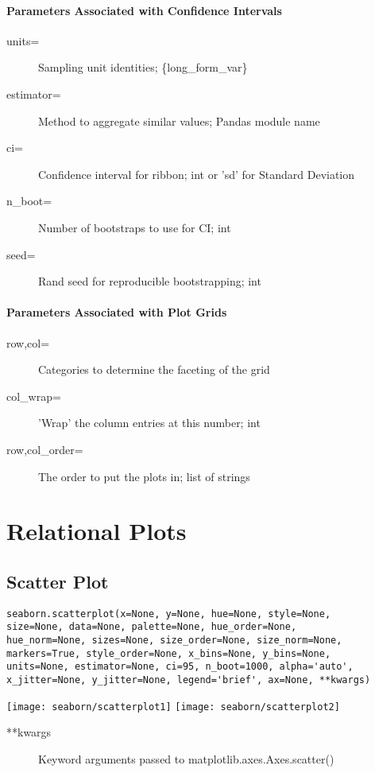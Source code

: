 \paragraph{Parameters Associated with Confidence Intervals}
\begin{description}
	\item[units=] Sampling unit identities; \{long\_form\_var\}
	\item[estimator=] Method to aggregate similar values; Pandas module name
	\item[ci=] Confidence interval for ribbon; int or 'sd' for Standard Deviation
	\item[n\_boot=] Number of bootstraps to use for CI; int
	\item[seed=] Rand seed for reproducible bootstrapping; int
\end{description}

\paragraph{Parameters Associated with Plot Grids}
\begin{description}
	\item[row,col=] Categories to determine the faceting of the grid
	\item[col\_wrap=] 'Wrap' the column entries at this number; int
	\item[row,col\_order=] The order to put the plots in; list of strings
\end{description}

\section{Relational Plots} 

\subsection{Scatter Plot}
\begin{verbatim}
seaborn.scatterplot(x=None, y=None, hue=None, style=None, 
size=None, data=None, palette=None, hue_order=None, 
hue_norm=None, sizes=None, size_order=None, size_norm=None, 
markers=True, style_order=None, x_bins=None, y_bins=None, 
units=None, estimator=None, ci=95, n_boot=1000, alpha='auto', 
x_jitter=None, y_jitter=None, legend='brief', ax=None, **kwargs)
\end{verbatim}
\texttt{[image: seaborn/scatterplot1]}
\texttt{[image: seaborn/scatterplot2]}
\begin{description}
	\item[**kwargs] Keyword arguments passed to matplotlib.axes.Axes.scatter()
\end{description}

